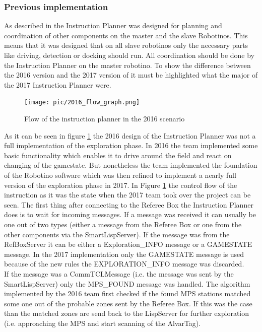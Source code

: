 \subsubsection{Previous implementation}
\label{sec:previous}

As described in \cite{BOK} the Instruction Planner was designed for planning and coordination of other components on the master and the slave Robotinos. This means that it was designed that on all slave robotinos only the necessary parts like driving, detection or docking should run. All coordination should be done by the Instruction Planner on the master robotino. To show the difference between the 2016 version and the 2017 version of it must be highlighted what the major of the 2017 Instruction Planner were.  



\begin{figure}[h]
\centering
\texttt{[image: pic/2016\_flow\_graph.png]}
\caption{Flow of the instruction planner in the 2016 scenario}
\label{fig:ip2016}

\end{figure}


As it can be seen in figure \ref{fig:ip2016} the 2016 design of the Instruction Planner was not a full implementation of the exploration phase. In 2016 the team implemented some basic functionality which enables it to drive around the field and react on changing of the gamestate. But nonetheless the team implemented the foundation of the Robotino software which was then refined to implement a nearly full version of the exploration phase in 2017. In Figure \ref{fig:ip2016} the control flow of the instruction as it was the state when the 2017 team took over the project can be seen. The first thing after connecting to the Referee Box the Instruction Planner does is to wait for incoming messages. If a message was received it can usually be one out of two types (either a message from the Referee Box or one from the other components via the SmartLispServer). If the message was from the RefBoxServer it can be either a Exploration\_INFO message or a GAMESTATE message. In the 2017 implementation only the GAMESTATE message is used because of the new rules the EXPLORATION\_INFO message was discarded. \\

If the message was a CommTCLMessage (i.e. the message was sent by the SmartLispServer) only the MPS\_FOUND message was handled. The algorithm implemented by the 2016 team first checked if the found MPS stations matched some one out of the probable zones sent by the Referee Box. If this was the case than the matched zones are send back to the LispServer for further exploration (i.e. approaching the MPS and start scanning of the AlvarTag). \\

